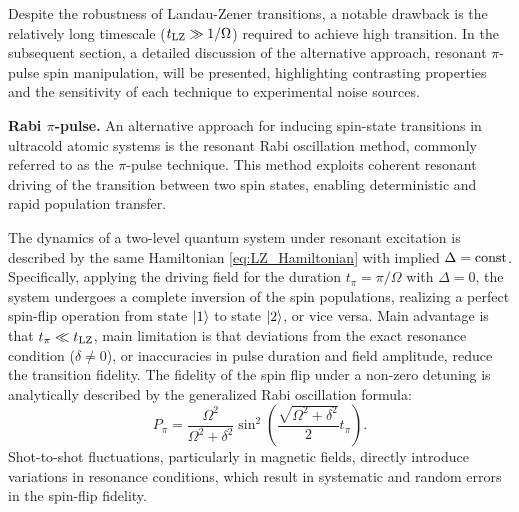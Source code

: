 
Despite the robustness of Landau-Zener transitions, a notable drawback is the relatively long timescale ($t_{\textnormal{LZ}} \gg 1/\Omega$) required to achieve high transition.  In the subsequent section, a detailed discussion of the alternative approach, resonant $\pi$-pulse spin manipulation, will be presented, highlighting contrasting properties and the sensitivity of each technique to experimental noise sources.


\textbf{Rabi $\pi$-pulse.}
An alternative approach for inducing spin-state transitions in ultracold atomic systems is the resonant Rabi oscillation method, commonly referred to as the $\pi$-pulse technique. This method exploits coherent resonant driving of the transition between two spin states, enabling deterministic and rapid population transfer.

The dynamics of a two-level quantum system under resonant excitation is described by the same Hamiltonian \eqref{eq:LZ_Hamiltonian} with implied $\Delta = \textnormal{const}$. Specifically, applying the driving field for the duration $t_\pi = \pi/\Omega$ with $\Delta=0$, the system undergoes a complete inversion of the spin populations, realizing a perfect spin-flip operation from state $\left| 1 \right\rangle$ to state $\left| 2 \right\rangle$, or vice versa. Main advantage is that $t_\pi \ll t_{\textnormal{LZ}}$, main limitation is that deviations from the exact resonance condition ($\delta \neq 0$), or inaccuracies in pulse duration and field amplitude, reduce the transition fidelity. The fidelity of the spin flip under a non-zero detuning is analytically described by the generalized Rabi oscillation formula:
\begin{equation}
P_{\pi} = \frac{\Omega^2}{\Omega^2+\delta^2}\sin^2\left(\frac{\sqrt{\Omega^2+\delta^2}}{2}t_{\pi}\right).
\label{eq:pi_fidelity}
\end{equation}
Shot-to-shot fluctuations, particularly in magnetic fields, directly introduce variations in resonance conditions, which result in systematic and random errors in the spin-flip fidelity. 


